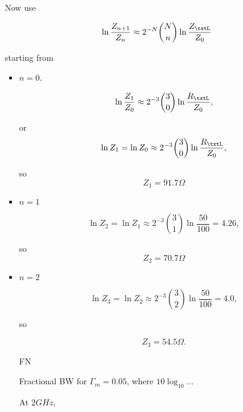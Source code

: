 Now use 

\begin{equation}\label{eqn:uwavesDeck7MultisectionTransformersCore:460}
\ln \frac{Z_{n+1}}{Z_n} \approx 2^{-N} \binom{N}{n} \ln \frac{Z_\txtL}{Z_0}
\end{equation}

starting from 

\begin{itemize}
\item \( n = 0 \).

\begin{equation}\label{eqn:uwavesDeck7MultisectionTransformersCore:480}
\ln \frac{Z_{1}}{Z_0} \approx 2^{-3} \binom{3}{0} \ln \frac{R_\txtL}{Z_0},
\end{equation}

or
\begin{equation}\label{eqn:uwavesDeck7MultisectionTransformersCore:500}
\ln Z_{1} = \ln Z_0 \approx 2^{-3} \binom{3}{0} \ln \frac{R_\txtL}{Z_0},
\end{equation}

so
\begin{equation}\label{eqn:uwavesDeck7MultisectionTransformersCore:520}
Z_1 = 91.7 \Omega
\end{equation}

\item \( n = 1 \)

\begin{dmath}\label{eqn:uwavesDeck7MultisectionTransformersCore:540}
\ln Z_{2} = \ln Z_1 \approx 2^{-3} \binom{3}{1} \ln \frac{50}{100} = 4.26,
\end{dmath}

so
\begin{dmath}\label{eqn:uwavesDeck7MultisectionTransformersCore:560}
Z_2 = 70.7 \Omega
\end{dmath}

\item \( n = 2 \)

\begin{dmath}\label{eqn:uwavesDeck7MultisectionTransformersCore:580}
\ln Z_{3} = \ln Z_2 \approx 2^{-3} \binom{3}{2} \ln \frac{50}{100} = 4.0,
\end{dmath}

so

\begin{dmath}\label{eqn:uwavesDeck7MultisectionTransformersCore:600}
Z_3 = 54.5 \Omega.
\end{dmath}

FN

Fractional BW for \( \Gamma_m = 0.05 \), where \( 10 \log_{10} ... \)

At \( 2 \si{GHz} \),


\end{itemize}
